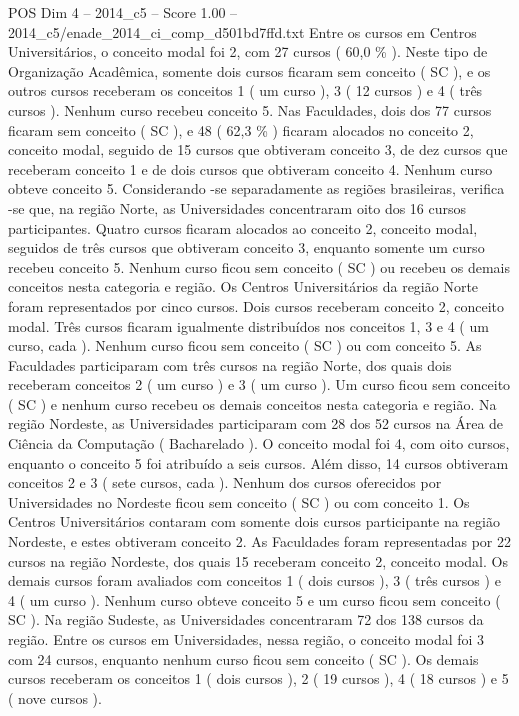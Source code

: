 \begin{textsample}{POS Dim 4 – 2014\_c5 – Score 1.00 – 2014\_c5/enade\_2014\_ci\_comp\_d501bd7ffd.txt}
Entre os cursos em Centros Universitários, o conceito modal foi 2, com 27 cursos ( 60,0 \% ).
Neste tipo de Organização Acadêmica, somente dois cursos ficaram sem conceito ( SC ), e os outros cursos receberam os conceitos 1 ( um curso ), 3 ( 12 cursos ) e 4 ( três cursos ).
Nenhum curso recebeu conceito 5.
Nas Faculdades, dois dos 77 cursos ficaram sem conceito ( SC ), e 48 ( 62,3 \% ) ficaram alocados no conceito 2, conceito modal, seguido de 15 cursos que obtiveram conceito 3, de dez cursos que receberam conceito 1 e de dois cursos que obtiveram conceito 4.
Nenhum curso obteve conceito 5.
Considerando -se separadamente as regiões brasileiras, verifica -se que, na região Norte, as Universidades concentraram oito dos 16 cursos participantes.
Quatro cursos ficaram alocados ao conceito 2, conceito modal, seguidos de três cursos que obtiveram conceito 3, enquanto somente um curso recebeu conceito 5.
Nenhum curso ficou sem conceito ( SC ) ou recebeu os demais conceitos nesta categoria e região.
Os Centros Universitários da região Norte foram representados por cinco cursos.
Dois cursos receberam conceito 2, conceito modal.
Três cursos ficaram igualmente distribuídos nos conceitos 1, 3 e 4 ( um curso, cada ).
Nenhum curso ficou sem conceito ( SC ) ou com conceito 5.
As Faculdades participaram com três cursos na região Norte, dos quais dois receberam conceitos 2 ( um curso ) e 3 ( um curso ).
Um curso ficou sem conceito ( SC ) e nenhum curso recebeu os demais conceitos nesta categoria e região.
Na região Nordeste, as Universidades participaram com 28 dos 52 cursos na Área de Ciência da Computação ( Bacharelado ).
O conceito modal foi 4, com oito cursos, enquanto o conceito 5 foi atribuído a seis cursos.
Além disso, 14 cursos obtiveram conceitos 2 e 3 ( sete cursos, cada ).
Nenhum dos cursos oferecidos por Universidades no Nordeste ficou sem conceito ( SC ) ou com conceito 1.
Os Centros Universitários contaram com somente dois cursos participante na região Nordeste, e estes obtiveram conceito 2.
As Faculdades foram representadas por 22 cursos na região Nordeste, dos quais 15 receberam conceito 2, conceito modal.
Os demais cursos foram avaliados com conceitos 1 ( dois cursos ), 3 ( três cursos ) e 4 ( um curso ).
Nenhum curso obteve conceito 5 e um curso ficou sem conceito ( SC ).
Na região Sudeste, as Universidades concentraram 72 dos 138 cursos da região.
Entre os cursos em Universidades, nessa região, o conceito modal foi 3 com 24 cursos, enquanto nenhum curso ficou sem conceito ( SC ).
Os demais cursos receberam os conceitos 1 ( dois cursos ), 2 ( 19 cursos ), 4 ( 18 cursos ) e 5 ( nove cursos ).

\end{textsample}
